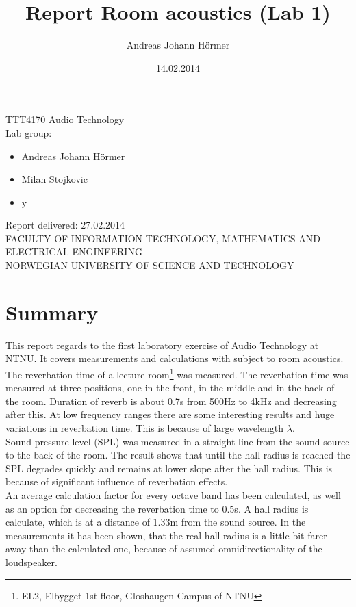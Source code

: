 \documentclass{article}
\title{Report Room acoustics (Lab 1)}
\author{Andreas Johann H\"ormer}
\date{14.02.2014}
\begin{document}
\maketitle
\begin{center}
TTT4170 Audio Technology\\[3cm]
Lab group:
\begin{itemize}
\item Andreas Johann H\"ormer
\item Milan Stojkovic
\item y\\[3cm]
\end{itemize}
Report delivered: 27.02.2014\\[6cm]
FACULTY OF INFORMATION TECHNOLOGY, MATHEMATICS AND ELECTRICAL ENGINEERING\\
NORWEGIAN UNIVERSITY OF SCIENCE AND TECHNOLOGY
\end{center}

\tableofcontents

\newpage
\section*{Summary}
This report regards to the first laboratory exercise of Audio Technology at NTNU. It covers measurements and calculations with subject to room acoustics.\\
The reverbation time of a lecture room\footnote{EL2, Elbygget 1st floor, Gloshaugen Campus of NTNU} was measured. The reverbation time was measured at three positions, one in the front, in the middle and in the back of the room. Duration of reverb is about 0.7s from 500Hz to 4kHz and decreasing after this. At low frequency ranges there are some interesting results and huge variations in reverbation time. This is because of large wavelength $\lambda$.\\
Sound pressure level (SPL) was measured in a straight line from the sound source to the back of the room. The result shows that until the hall radius is reached the SPL degrades quickly and remains at lower slope after the hall radius. This is because of significant influence of reverbation effects.\\
An average calculation factor for every octave band has been calculated, as well as an option for decreasing the reverbation time to 0.5s. A hall radius is calculate, which is at a distance of 1.33m from the sound source. In the measurements it has been shown, that the real hall radius is a little bit farer away than the calculated one, because of assumed omnidirectionality of the loudspeaker.
\newpage
\end{document}
